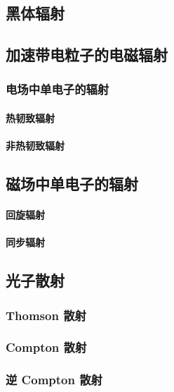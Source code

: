 \subsection{黑体辐射}

\subsection{加速带电粒子的电磁辐射}

\subsubsection{电场中单电子的辐射}

\paragraph{热韧致辐射}

\paragraph{非热韧致辐射}

\subsection{磁场中单电子的辐射}

\paragraph{回旋辐射}

\paragraph{同步辐射}

\subsection{光子散射}

\subsubsection{Thomson 散射}

\subsubsection{Compton 散射}

\subsubsection{逆 Compton 散射}

